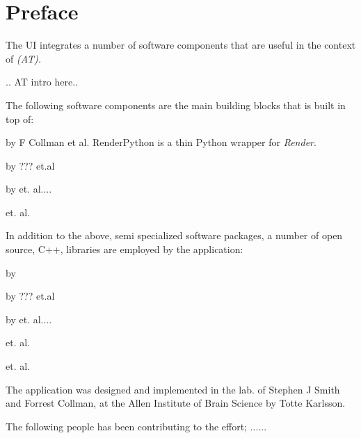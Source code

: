 

\doublespacing

\usechapterimagefalse %
\chapter*{Preface}
The \ate UI integrates a number of software components that are useful in the context of \emph{\at  (AT). }


.. AT intro here..

The following software components are the main building blocks that \ate is built in top of:

\begin{description}[font=$\bullet$~\normalfont\scshape\color{red!50!black}]
\item [Render Python] by F Collman et al. RenderPython is a thin Python wrapper for \emph{Render}.
\item [Render] by ??? et.al 
\item [Fiji] by et. al....
\item [Docker] et. al.
\end{description}

In addition to the above, semi specialized software packages, a number of open source, C++, libraries are employed by the \ate application:


\begin{description}[font=$\bullet$~\normalfont\scshape\color{red!50!black}]
\item [VTK] by 
\item [Poco] by ??? et.al 
\item [libCURL] by et. al....
\item [TinyXML2] et. al.
\item [Dune Scientific Library (dsl) ] et. al.

\end{description}


The \ate application was designed and implemented in the lab. of  Stephen J Smith and Forrest Collman, at the Allen Institute of Brain Science by Totte Karlsson.

The following people has been contributing to the effort; ......


\cleardoublepage
